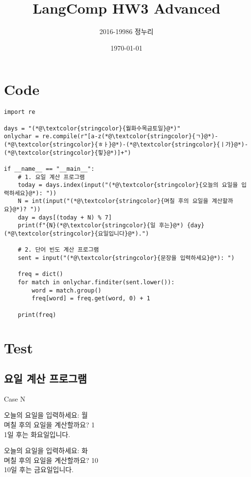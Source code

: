 \documentclass[a4paper,11pt]{scrartcl}
\title{\vspace{-0.5in}LangComp HW3 Advanced}
\author{\vspace{-15pt}2016-19986 정누리}
\date{\vspace{-5pt}\today}
\begin{document}
\maketitle

\section*{Code}
\begin{lstlisting}
import re

days = "(*@\textcolor{stringcolor}{월화수목금토일}@*)"
onlychar = re.compile(r"[a-z(*@\textcolor{stringcolor}{ㄱ}@*)-(*@\textcolor{stringcolor}{ㅎㅏ}@*)-(*@\textcolor{stringcolor}{ㅣ가}@*)-(*@\textcolor{stringcolor}{힣}@*)]+")

if __name__ == "__main__":
    # 1. 요일 계산 프로그램
    today = days.index(input("(*@\textcolor{stringcolor}{오늘의 요일을 입력하세요}@*): "))
    N = int(input("(*@\textcolor{stringcolor}{며칠 후의 요일을 계산할까요}@*)? "))
    day = days[(today + N) % 7]
    print(f"{N}(*@\textcolor{stringcolor}{일 후는}@*) {day}(*@\textcolor{stringcolor}{요일입니다}@*).")

    # 2. 단어 빈도 계산 프로그램
    sent = input("(*@\textcolor{stringcolor}{문장을 입력하세요}@*): ")

    freq = dict()
    for match in onlychar.finditer(sent.lower()):
        word = match.group()
        freq[word] = freq.get(word, 0) + 1

    print(freq)

\end{lstlisting}

\newpage
\section*{Test}
\subsection{요일 계산 프로그램}

\begin{labeling}{Case N}
  \item[Case 1]
  {\ttfamily
    오늘의 요일을 입력하세요: 월 \\
    며칠 후의 요일을 계산할까요? 1 \\
    1일 후는 화요일입니다.
  }

  \item[Case 2]
  {\ttfamily
    오늘의 요일을 입력하세요: 화 \\
    며칠 후의 요일을 계산할까요? 10 \\
    10일 후는 금요일입니다.
  }
\end{labeling}
\end{document}
